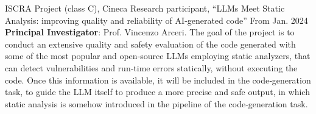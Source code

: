 
\begin{cventries}
	\cventry
	{ISCRA Project (class C), Cineca}
	{Research participant, \textquotedblleft{LLMs Meet Static Analysis: improving quality and reliability of AI‑generated code}\textquotedblright}
	{}
	{From Jan. 2024}
	{ \textbf{Principal Investigator}: Prof. Vincenzo Arceri. The goal of the project is to conduct an extensive quality and safety evaluation of the code generated with some of the most popular and open‑source LLMs employing static analyzers, that can detect vulnerabilities and run‑time errors statically, without executing the code. Once this information is available, it will be included in the code‑generation task, to guide the LLM itself to produce a more precise and safe output, in which static analysis is somehow introduced in the pipeline of the code‑generation task. }

\end{cventries}
